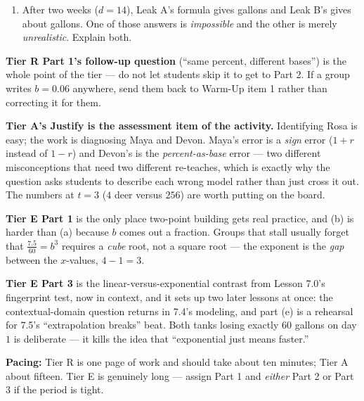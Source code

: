 \documentclass[10pt]{article}
\begin{document}
\begin{tcolorbox}[colback=white, colframe=black!40, title=\textbf{Tier E --- Extension},
    fonttitle=\bfseries, arc=1.5mm, left=3mm, right=3mm, top=2mm, bottom=2mm, breakable]
\begin{enumerate}[label=(\alph*), leftmargin=1.9em, itemsep=6pt]
  \item After two weeks ($d=14$), Leak A's formula gives  gallons and Leak B's
        gives about  gallons. One of those answers is \emph{impossible} and the
        other is merely \emph{unrealistic}. Explain both.
\end{enumerate}
\end{tcolorbox}

\begin{teachernote}
\textbf{Tier R Part 1's follow-up question} (``same percent, different bases'') is the whole point of
the tier --- do not let students skip it to get to Part 2. If a group writes $b=0.06$ anywhere, send
them back to Warm-Up item 1 rather than correcting it for them.

\textbf{Tier A's Justify is the assessment item of the activity.} Identifying Rosa is easy; the
work is diagnosing Maya and Devon. Maya's error is a \emph{sign} error ($1+r$ instead of $1-r$) and
Devon's is the \emph{percent-as-base} error --- two different misconceptions that need two different
re-teaches, which is exactly why the question asks students to describe each wrong model rather than
just cross it out. The numbers at $t=3$ ($4$ deer versus $256$) are worth putting on the board.

\textbf{Tier E Part 1} is the only place two-point building gets real practice, and (b) is harder than
(a) because $b$ comes out a fraction. Groups that stall usually forget that $\frac{7.5}{60}=b^{3}$
requires a \emph{cube} root, not a square root --- the exponent is the \emph{gap} between the
$x$-values, $4-1=3$.

\textbf{Tier E Part 3} is the linear-versus-exponential contrast from Lesson 7.0's fingerprint test,
now in context, and it sets up two later lessons at once: the contextual-domain question returns in
7.4's modeling, and part (e) is a rehearsal for 7.5's ``extrapolation breaks'' beat. Both tanks
losing exactly $60$ gallons on day $1$ is deliberate --- it kills the idea that ``exponential just
means faster.''

\textbf{Pacing:} Tier R is one page of work and should take about ten minutes; Tier A about fifteen.
Tier E is genuinely long --- assign Part 1 and \emph{either} Part 2 or Part 3 if the period is tight.
\end{teachernote}
\end{document}

